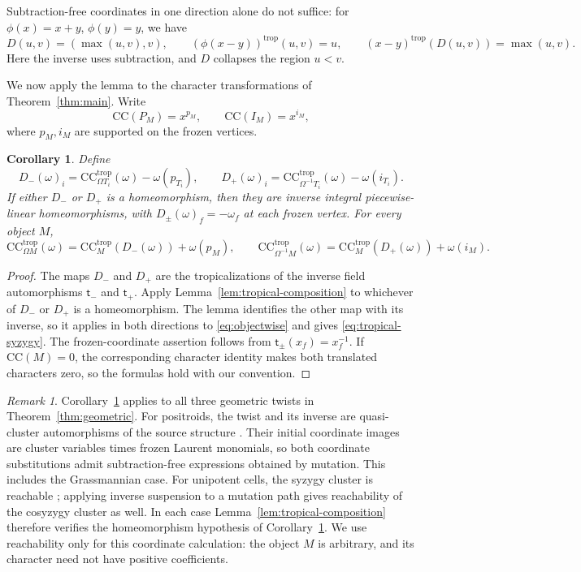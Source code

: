 \documentclass[11pt]{amsart}
\numberwithin{equation}{section}
\newtheorem{corollary}[theorem]{Corollary}
\theoremstyle{definition}
\theoremstyle{remark}
\newtheorem{remark}[theorem]{Remark}
\newcommand{\CC}{\mathrm{CC}}
\begin{document}
Subtraction-free coordinates in one direction alone do not suffice:
for $\phi(x)=x+y$, $\phi(y)=y$, we have
\[ D(u,v)=(\max(u,v),v),\qquad (\phi(x-y))^{\mathrm{trop}}(u,v)=u,\qquad (x-y)^{\mathrm{trop}}(D(u,v))=\max(u,v). \]
Here the inverse uses subtraction, and $D$ collapses the region $u<v$.

We now apply the lemma to the character transformations of
Theorem~\ref{thm:main}. Write
\[ \CC(P_M)=x^{p_M},\qquad \CC(I_M)=x^{i_M}, \]
where $p_M,i_M$ are supported on the frozen vertices.

\begin{corollary}\label{cor:tropical-syzygy}
Define
\[ D_-(\omega)_i=\CC^{\mathrm{trop}}_{\Omega T_i}(\omega)-\omega(p_{T_i}),\qquad D_+(\omega)_i=\CC^{\mathrm{trop}}_{\Omega^{-1}T_i}(\omega)-\omega(i_{T_i}). \]
If either $D_-$ or $D_+$ is a homeomorphism, then they are inverse integral
piecewise-linear homeomorphisms, with $D_\pm(\omega)_f=-\omega_f$ at
each frozen vertex. For every object $M$,
\begin{equation}\label{eq:tropical-syzygy} \CC^{\mathrm{trop}}_{\Omega M}(\omega)=\CC^{\mathrm{trop}}_M(D_-(\omega))+\omega(p_M),\qquad \CC^{\mathrm{trop}}_{\Omega^{-1}M}(\omega)=\CC^{\mathrm{trop}}_M(D_+(\omega))+\omega(i_M).\end{equation}
\end{corollary}

\begin{proof}
The maps $D_-$ and $D_+$ are the tropicalizations of the inverse field
automorphisms $\mathsf t_-$ and $\mathsf t_+$. Apply
Lemma~\ref{lem:tropical-composition} to whichever of $D_-$ or $D_+$ is a
homeomorphism. The lemma identifies the other map with its inverse, so it
applies in both directions to \eqref{eq:objectwise} and gives
\eqref{eq:tropical-syzygy}. The frozen-coordinate assertion follows from
$\mathsf t_\pm(x_f)=x_f^{-1}$. If $\CC(M)=0$, the corresponding
character identity makes both translated characters zero, so the formulas
hold with our convention.
\end{proof}

\begin{remark}\label{rem:geometric-tropical}
Corollary~\ref{cor:tropical-syzygy} applies to all three geometric twists in
Theorem~\ref{thm:geometric}. For positroids, the twist and its inverse
are quasi-cluster automorphisms of the source structure
\cite[Theorem~7.2 and Proposition~7.3]{Pre}. Their initial coordinate
images are cluster variables times frozen Laurent monomials, so both
coordinate substitutions admit subtraction-free expressions obtained by
mutation. This includes the Grassmannian case. For unipotent cells, the
syzygy cluster is reachable \cite[Section~4.1]{GLS12}; applying inverse
suspension to a mutation path gives reachability of the cosyzygy cluster as
well. In each case Lemma~\ref{lem:tropical-composition} therefore verifies
the homeomorphism hypothesis of Corollary~\ref{cor:tropical-syzygy}. We
use reachability only for this coordinate calculation: the object $M$ is
arbitrary, and its character need not have positive coefficients.
\end{remark}
\end{document}
